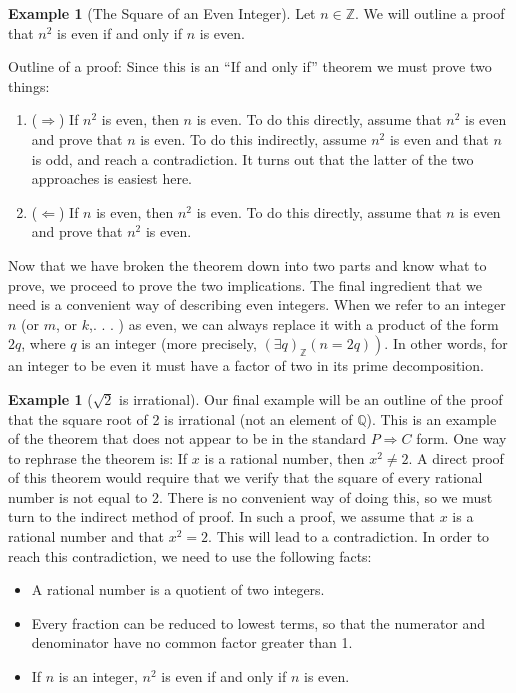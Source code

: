 \documentclass[10pt,]{book}
\theoremstyle{plain}
\theoremstyle{definition}
\theoremstyle{definition}
\theoremstyle{definition}
\newtheorem{example}[theorem]{Example}
\theoremstyle{definition}
\begin{document}
\begin{example}[The Square of an Even Integer]\label{ex-squares-of-evens}
Let \(n \in  \mathbb{Z}\). We will outline a proof that \(n^2\) is even if and only if \(n\) is even.%
\par
Outline of a proof: Since this is an ``If and only if'' theorem we must prove two things:%
\par
\leavevmode%
\begin{enumerate}[label=\Roman*]
\item\hypertarget{li-331}{} (\(\Rightarrow \)) If \(n^2\) is even, then \(n\) is even. To do this directly, assume that \(n^{2 }\) is even and prove that \(n\) is even.   To do this indirectly, assume \(n^2\) is even and that \(n\) is odd, and reach a contradiction.   It turns out that the latter of the two approaches is easiest here.%
\item\hypertarget{li-332}{} (\(\Leftarrow \)) If \(n\) is even, then \(n^2\) is even. To do this directly, assume that \(n\) is even and prove that \(n^2\) is even. %
\end{enumerate}
%
\par
Now that we have broken the theorem down into two parts and know what to prove, we proceed to prove the two implications. The final ingredient that we need is a convenient way of describing even integers. When we refer to an integer \(n\) (or \(m\), or \(k\),. . . ) as even, we can always replace it with a product of the form \(2q\), where \(q\) is an integer (more precisely, \(\left.(\exists q) _{\mathbb{Z}} (n = 2q)\right)\). In other words, for an integer to be even it must have a factor of two in its prime decomposition.%
\end{example}
\begin{example}[\(\sqrt{2}\) is irrational]\label{ex-sqrt-2-irrational}
 Our final example will be an outline of the proof that the square root of 2 is irrational (not an element of \(\mathbb{Q}\)). This is an example of the theorem that does not appear to be in the standard \(P \Rightarrow  C\) form. One way to rephrase the theorem is: If \(x\) is a  rational number, then \(x^2\neq 2\). A direct proof of this theorem would require that we verify that the square of every rational number is not equal to 2. There is no convenient way of doing this, so we must turn to the indirect method of proof. In such a proof, we assume that \(x\) is a  rational number and that \(x^2=2\). This will lead to a contradiction. In order to reach this contradiction, we need to use the following facts:%
\par
\leavevmode%
\begin{itemize}[label=\textbullet]
\item{}A rational number is a quotient of two integers.%
\item{}Every fraction can be reduced to lowest terms, so that the numerator and denominator have no common factor greater than 1.%
\item{}If \(n\) is an integer, \(n^2\) is even if and only if \(n\) is even.%
\end{itemize}
%
\end{example}
\typeout{************************************************}
\typeout{************************************************}
\end{document}
